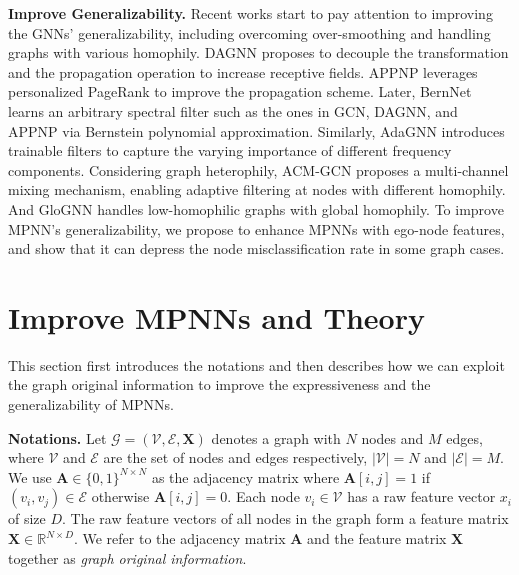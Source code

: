 \documentclass{article}
\theoremstyle{plain}
\begin{document}
\textbf{Improve Generalizability.}
Recent works start to pay attention to improving the GNNs' generalizability, including overcoming over-smoothing and handling graphs with various homophily.
DAGNN \cite{liu2020towards}  proposes to decouple the transformation and the propagation operation to increase receptive fields.
APPNP \cite{klicpera2018predict} leverages personalized PageRank to improve the propagation scheme.
Later, BernNet \cite{he2021bernnet} learns an arbitrary spectral filter such as the ones in GCN, DAGNN, and APPNP via Bernstein polynomial approximation.
Similarly, AdaGNN \cite{dong2021adagnn} introduces trainable filters to capture the varying importance of different frequency components.
Considering graph heterophily, ACM-GCN \cite{luan2022revisiting} proposes a multi-channel mixing mechanism, enabling adaptive filtering at nodes with different homophily.
And GloGNN \cite{li2022finding} handles low-homophilic graphs with global homophily.
To improve MPNN's generalizability, we propose to enhance MPNNs with ego-node features, and show that it can depress the node misclassification rate in some graph cases.




\section{Improve MPNNs and Theory} \label{sec:theory}
This section first introduces the notations and then describes how we can exploit the graph original information to improve the expressiveness and the generalizability of MPNNs. 

\textbf{Notations.}
Let $\mathcal{G}=(\mathcal{V},\mathcal{E},\mathbf{X})$ denotes a graph with $N$ nodes and $M$ edges, where $\mathcal{V}$ and $\mathcal{E}$ are the set of nodes and edges respectively, $|\mathcal{V}|=N$ and $|\mathcal{E}|=M$. 
We use $\mathbf{A} \in \{0,1\}^{N \times N}$ as the adjacency matrix where $\mathbf{A}[i,j]=1$ if $(v_i,v_j) \in \mathcal{E}$ otherwise $\mathbf{A}[i,j]=0$. 
Each node $v_i \in \mathcal{V}$ has a raw feature vector $x_i$ of size $D$. 
The raw feature vectors of all nodes in the graph form a feature matrix $\mathbf{X} \in \mathbb{R}^{N \times D}$. We refer to the adjacency matrix $\mathbf{A}$ and the feature matrix $\mathbf{X}$ together as \textit{graph original information}. 
\end{document}
